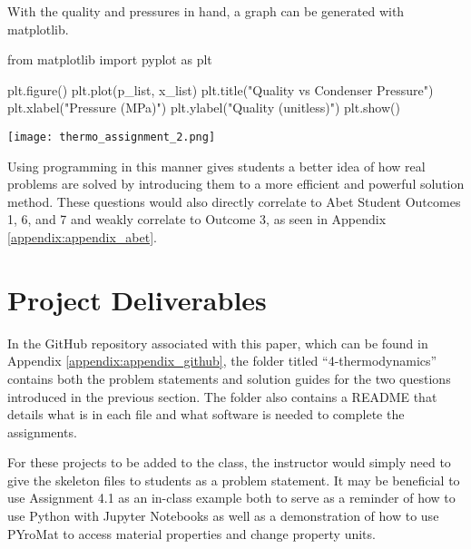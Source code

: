 \begin{tcolorbox}[breakable, enhanced jigsaw, title=ME 513: Assignment \ref{thermo_assignment_2}, 
    colframe=ksu-purple, colback=ksu-gray]
    With the quality and pressures in hand, a graph can be generated with matplotlib.

\begin{python}
from matplotlib import pyplot as plt

plt.figure()
plt.plot(p_list, x_list)
plt.title("Quality vs Condenser Pressure")
plt.xlabel("Pressure (MPa)")
plt.ylabel("Quality (unitless)")
plt.show()
\end{python}
\begin{center}
    \texttt{[image: thermo\_assignment\_2.png]}
\end{center}
\end{tcolorbox}

Using programming in this manner gives students a better idea of how real problems are solved by introducing
them to a more efficient and powerful solution method. These questions would also directly correlate to Abet 
Student Outcomes 1, 6, and 7 and weakly correlate to Outcome 3, as seen in Appendix \ref{appendix:appendix_abet}.

\section{Project Deliverables}

In the GitHub repository associated with this paper, which can be found in Appendix \ref{appendix:appendix_github},
the folder titled ``4-thermodynamics'' contains both the problem statements and solution guides for the two questions
introduced in the previous section. The folder also contains a README that details what is in each file and 
what software is needed to complete the assignments. 

For these projects to be added to the class, the instructor would simply need to give the skeleton files to 
students as a problem statement. It may be beneficial to use Assignment 4.1 as an in-class example both to serve 
as a reminder of how to use Python with Jupyter Notebooks as well as a demonstration of how to use PYroMat to 
access material properties and change property units.
